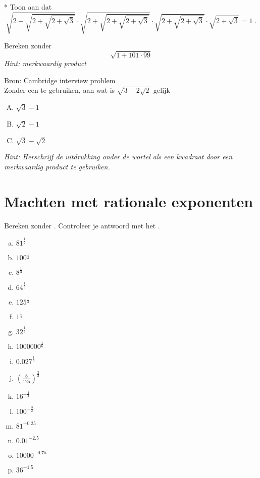 \documentclass[12pt,twoside]{article}
\begin{document}
\begin{oefening}*
Toon aan dat
$$\sqrt{2-\sqrt{2+\sqrt{2+\sqrt{3}}}}\cdot\sqrt{2+\sqrt{2+\sqrt{2+\sqrt{3}}}}\cdot\sqrt{2+\sqrt{2+\sqrt{3}}}\cdot\sqrt{2+\sqrt{3}} = 1\;.$$
\end{oefening}

\begin{oefening}
Bereken zonder 
$$\sqrt{1+101\cdot99}$$
{\em Hint: merkwaardig product}
\end{oefening}

\begin{oefening}{\scriptsize Bron: Cambridge interview problem}\\
  Zonder een  te gebruiken, aan wat is  $\displaystyle\sqrt{3 - 2\sqrt{2}}$  gelijk
  \begin{enumerate}[(A)]
  \item $\sqrt{3}-1$
  \item $\sqrt{2}-1$
  \item $\sqrt{3}-\sqrt{2}$
  \end{enumerate}
  {\em Hint: Herschrijf de uitdrukking onder de wortel als een kwadraat door een merkwaardig product te gebruiken.}
\end{oefening}

\pagebreak
\section{Machten met rationale exponenten}

\begin{oefening}
Bereken zonder . Controleer je antwoord met het .
\begin{multicols}{3}
\begin{enumerate}[(a)]
  \itemsep.5em
  \item ${81}^{\frac{1}{2}}$
  \item ${100}^{\frac{1}{2}}$
  \item ${8}^{\frac{1}{3}}$
  \item ${64}^{\frac{1}{3}}$
  \item ${125}^{\frac{1}{3}}$
  \item ${1}^{\frac{1}{4}}$
  \item ${32}^{\frac{1}{5}}$
  \item ${1000000}^{\frac{1}{6}}$
  \item ${0.027}^{\frac{1}{3}}$
  \item $\left(\frac{8}{125}\right)^{\frac{2}{3}}$
  \item ${16}^{-\frac{1}{4}}$
  \item ${100}^{-\frac{3}{2}}$
  \item ${81}^{-0.25}$
  \item ${0.01}^{-2.5}$
  \item ${10000}^{-0.75}$
  \item ${36}^{-1.5}$
\end{enumerate}
\end{multicols}
\end{oefening}
\end{document}
